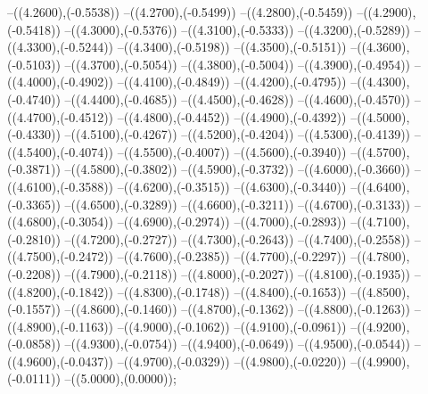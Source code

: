 {	--({\sx*(4.2600)},{\sy*(-0.5538)})
	--({\sx*(4.2700)},{\sy*(-0.5499)})
	--({\sx*(4.2800)},{\sy*(-0.5459)})
	--({\sx*(4.2900)},{\sy*(-0.5418)})
	--({\sx*(4.3000)},{\sy*(-0.5376)})
	--({\sx*(4.3100)},{\sy*(-0.5333)})
	--({\sx*(4.3200)},{\sy*(-0.5289)})
	--({\sx*(4.3300)},{\sy*(-0.5244)})
	--({\sx*(4.3400)},{\sy*(-0.5198)})
	--({\sx*(4.3500)},{\sy*(-0.5151)})
	--({\sx*(4.3600)},{\sy*(-0.5103)})
	--({\sx*(4.3700)},{\sy*(-0.5054)})
	--({\sx*(4.3800)},{\sy*(-0.5004)})
	--({\sx*(4.3900)},{\sy*(-0.4954)})
	--({\sx*(4.4000)},{\sy*(-0.4902)})
	--({\sx*(4.4100)},{\sy*(-0.4849)})
	--({\sx*(4.4200)},{\sy*(-0.4795)})
	--({\sx*(4.4300)},{\sy*(-0.4740)})
	--({\sx*(4.4400)},{\sy*(-0.4685)})
	--({\sx*(4.4500)},{\sy*(-0.4628)})
	--({\sx*(4.4600)},{\sy*(-0.4570)})
	--({\sx*(4.4700)},{\sy*(-0.4512)})
	--({\sx*(4.4800)},{\sy*(-0.4452)})
	--({\sx*(4.4900)},{\sy*(-0.4392)})
	--({\sx*(4.5000)},{\sy*(-0.4330)})
	--({\sx*(4.5100)},{\sy*(-0.4267)})
	--({\sx*(4.5200)},{\sy*(-0.4204)})
	--({\sx*(4.5300)},{\sy*(-0.4139)})
	--({\sx*(4.5400)},{\sy*(-0.4074)})
	--({\sx*(4.5500)},{\sy*(-0.4007)})
	--({\sx*(4.5600)},{\sy*(-0.3940)})
	--({\sx*(4.5700)},{\sy*(-0.3871)})
	--({\sx*(4.5800)},{\sy*(-0.3802)})
	--({\sx*(4.5900)},{\sy*(-0.3732)})
	--({\sx*(4.6000)},{\sy*(-0.3660)})
	--({\sx*(4.6100)},{\sy*(-0.3588)})
	--({\sx*(4.6200)},{\sy*(-0.3515)})
	--({\sx*(4.6300)},{\sy*(-0.3440)})
	--({\sx*(4.6400)},{\sy*(-0.3365)})
	--({\sx*(4.6500)},{\sy*(-0.3289)})
	--({\sx*(4.6600)},{\sy*(-0.3211)})
	--({\sx*(4.6700)},{\sy*(-0.3133)})
	--({\sx*(4.6800)},{\sy*(-0.3054)})
	--({\sx*(4.6900)},{\sy*(-0.2974)})
	--({\sx*(4.7000)},{\sy*(-0.2893)})
	--({\sx*(4.7100)},{\sy*(-0.2810)})
	--({\sx*(4.7200)},{\sy*(-0.2727)})
	--({\sx*(4.7300)},{\sy*(-0.2643)})
	--({\sx*(4.7400)},{\sy*(-0.2558)})
	--({\sx*(4.7500)},{\sy*(-0.2472)})
	--({\sx*(4.7600)},{\sy*(-0.2385)})
	--({\sx*(4.7700)},{\sy*(-0.2297)})
	--({\sx*(4.7800)},{\sy*(-0.2208)})
	--({\sx*(4.7900)},{\sy*(-0.2118)})
	--({\sx*(4.8000)},{\sy*(-0.2027)})
	--({\sx*(4.8100)},{\sy*(-0.1935)})
	--({\sx*(4.8200)},{\sy*(-0.1842)})
	--({\sx*(4.8300)},{\sy*(-0.1748)})
	--({\sx*(4.8400)},{\sy*(-0.1653)})
	--({\sx*(4.8500)},{\sy*(-0.1557)})
	--({\sx*(4.8600)},{\sy*(-0.1460)})
	--({\sx*(4.8700)},{\sy*(-0.1362)})
	--({\sx*(4.8800)},{\sy*(-0.1263)})
	--({\sx*(4.8900)},{\sy*(-0.1163)})
	--({\sx*(4.9000)},{\sy*(-0.1062)})
	--({\sx*(4.9100)},{\sy*(-0.0961)})
	--({\sx*(4.9200)},{\sy*(-0.0858)})
	--({\sx*(4.9300)},{\sy*(-0.0754)})
	--({\sx*(4.9400)},{\sy*(-0.0649)})
	--({\sx*(4.9500)},{\sy*(-0.0544)})
	--({\sx*(4.9600)},{\sy*(-0.0437)})
	--({\sx*(4.9700)},{\sy*(-0.0329)})
	--({\sx*(4.9800)},{\sy*(-0.0220)})
	--({\sx*(4.9900)},{\sy*(-0.0111)})
	--({\sx*(5.0000)},{\sy*(0.0000)});
}

